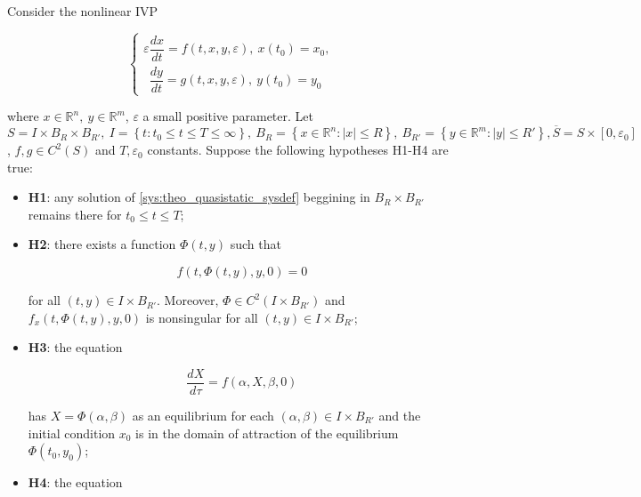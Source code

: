 \begin{theorem}\label{theo:qsh_approx_nonlinivps} %
	Consider the nonlinear IVP

\begin{equation}\left\{\begin{array}{l} \varepsilon \dfrac{dx}{dt} = f\left(t,x,y,\varepsilon\right),\ x\left(t_0\right) = x_0, \\[3mm]\phantom{\varepsilon} \dfrac{dy}{dt} = g\left(t,x,y,\varepsilon\right),\ y\left(t_0\right) = y_0 \end{array}\right. \label{sys:theo_quasistatic_sysdef}\end{equation}

	where $x\in\mathbb{R}^n,\ y\in\mathbb{R}^m$, $\varepsilon$ a small positive parameter. Let $S = I\times B_R\times B_{R'},\ I = \left\{t: t_0\leq t\leq T\leq \infty\right\},\ B_R = \left\{x\in\mathbb{R}^n: \left\lvert x\right\rvert \leq R\right\},\ B_{R'} = \left\{y\in\mathbb{R}^m:\left\lvert y\right\rvert \leq R'\right\}, \overline{S} = S\times\left[0,\varepsilon_0\right]$, $f,g\in C^2\left(S\right)$ and $T, \varepsilon_0$ constants. Suppose the following hypotheses H1-H4 are true:

\begin{itemize}
	\item\textbf{H1}: any solution of \eqref{sys:theo_quasistatic_sysdef} beggining in $B_R\times B_{R'}$ remains there for $t_0\leq t \leq T$;
	\item\textbf{H2}: there exists a function $\Phi\left(t,y\right)$ such that

\begin{equation} f\left(t,\Phi\left(t,y\right),y,0\right) = 0 \label{eq:theo_qsh_approx_nonlinivps_limf}\end{equation}

	for all $\left(t,y\right)\in I\times B_{R'}$. Moreover, $\Phi\in C^2\left(I\times B_{R'}\right)$ and $f_x\left(t,\Phi\left(t,y\right),y,0\right)$ is nonsingular for all $\left(t,y\right)\in I\times B_{R'}$;
	\item\textbf{H3}: the equation

\begin{equation} \dfrac{dX}{d\tau} = f\left(\alpha,X,\beta,0\right) \label{eq:theo_qsh_approx_nonlinivps_limX}\end{equation}

	has $X = \Phi\left(\alpha,\beta\right)$ as an equilibrium for each $\left(\alpha,\beta\right)\in I\times B_{R'}$ and the initial condition $x_0$ is in the domain of attraction of the equilibrium $\Phi\left(t_0,y_0\right)$;
	\item\textbf{H4}: the equation


\end{itemize}
\end{theorem}
